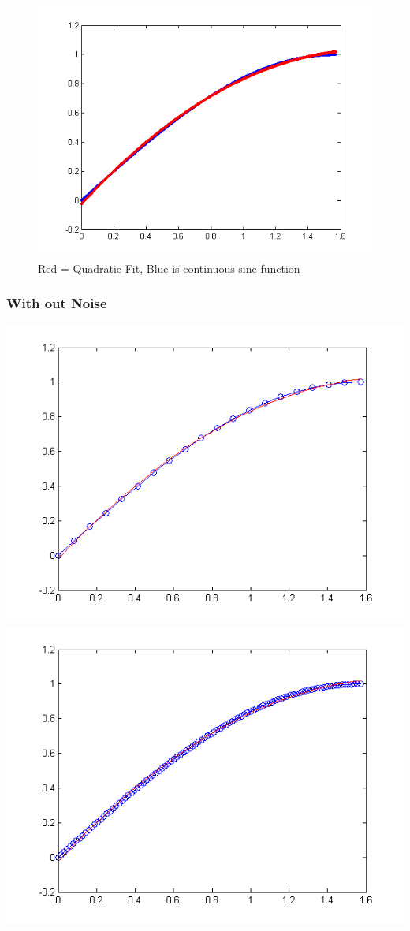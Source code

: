 \documentclass[12pt]{article}
\begin{document}
\begin{figure}[H]
\includegraphics[scale=.8]{plot11.png}
\caption{Red = Quadratic Fit,  Blue is continuous sine function}
\end{figure}


\subsubsection*{With out Noise}
\includegraphics[scale=.5]{plot8.png}
\includegraphics[scale=.5]{plot7.png}
\end{document}
